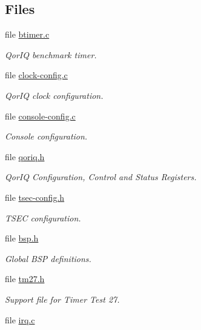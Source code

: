 \subsection*{Files}
\begin{DoxyCompactItemize}
\item 
file \mbox{\hyperlink{powerpc_2qoriq_2btimer_2btimer_8c}{btimer.\+c}}
\begin{DoxyCompactList}\small\item\em Qor\+IQ benchmark timer. \end{DoxyCompactList}\item 
file \mbox{\hyperlink{qoriq_2clock_2clock-config_8c}{clock-\/config.\+c}}
\begin{DoxyCompactList}\small\item\em Qor\+IQ clock configuration. \end{DoxyCompactList}\item 
file \mbox{\hyperlink{powerpc_2qoriq_2console_2console-config_8c}{console-\/config.\+c}}
\begin{DoxyCompactList}\small\item\em Console configuration. \end{DoxyCompactList}\item 
file \mbox{\hyperlink{qoriq_8h}{qoriq.\+h}}
\begin{DoxyCompactList}\small\item\em Qor\+IQ Configuration, Control and Status Registers. \end{DoxyCompactList}\item 
file \mbox{\hyperlink{qoriq_2include_2bsp_2tsec-config_8h}{tsec-\/config.\+h}}
\begin{DoxyCompactList}\small\item\em T\+S\+EC configuration. \end{DoxyCompactList}\item 
file \mbox{\hyperlink{bsps_2powerpc_2qoriq_2include_2bsp_8h}{bsp.\+h}}
\begin{DoxyCompactList}\small\item\em Global B\+SP definitions. \end{DoxyCompactList}\item 
file \mbox{\hyperlink{powerpc_2qoriq_2include_2tm27_8h}{tm27.\+h}}
\begin{DoxyCompactList}\small\item\em Support file for Timer Test 27. \end{DoxyCompactList}\item 
file \mbox{\hyperlink{bsps_2powerpc_2qoriq_2irq_2irq_8c}{irq.\+c}}

\end{DoxyCompactItemize}
